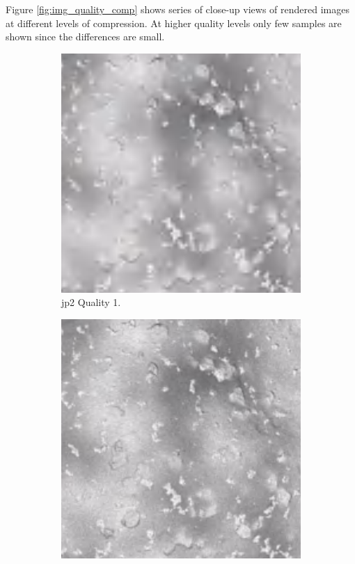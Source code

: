 Figure \ref{fig:img_quality_comp} shows series of close-up views of rendered images at different levels of compression. At higher quality levels only few samples are shown since the differences are small.

\begin{figure}[htb]
    \centering
        \begin{subfigure}[b]{0.47\textwidth}
            \centering
            \includegraphics[width=\textwidth]{doc/thesis/0_figures/compare_quality/set1/center/jp2_1_center.png}
            \caption{\gls{jp2} Quality 1.}
            \label{fig:img_quality_1}
        \end{subfigure}
        \begin{subfigure}[b]{0.47\textwidth}
            \centering
            \includegraphics[width=\textwidth]{doc/thesis/0_figures/compare_quality/set1/center/jp2_5_center.png}

\end{subfigure}
\end{figure}
